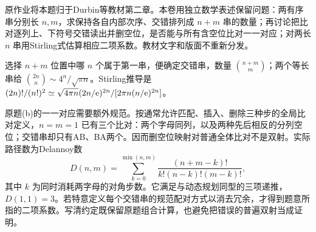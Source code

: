\begin{exercise}
原作业将本题归于Durbin等教材第二章。本卷用独立数学表述保留问题：两有序串分别长 $n,m$，求保持各自内部次序、交错排列成 $n+m$ 串的数量；再讨论把比对逐列上、下符号交错读出并删空位，是否能与所有含空位比对一一对应；对两长 $n$ 串用Stirling式估算相应二项系数。教材文字和版面不重新分发。
\end{exercise}
\begin{solution}
选择 $n+m$ 位置中哪 $n$ 个属于第一串，便确定交错串，数量 $\binom{n+m}m$；两个等长串给 $\binom{2n}n\sim4^n/\sqrt{\pi n}$。Stirling推导是 $(2n)!/(n!)^2\simeq\sqrt{4\pi n}(2n/\mathrm e)^{2n}/[2\pi n(n/\mathrm e)^{2n}]$。

原题(b)的一一对应需要额外规范。按通常允许匹配、插入、删除三种步的全局比对定义，$n=m=1$ 已有三个比对：两个字母同列，以及两种先后相反的分列空位；交错串却只有AB、BA两个。因而删空位映射对普通全体比对不是双射。实际路径数为Delannoy数
\[
D(n,m)=\sum_{k=0}^{\min(n,m)}\frac{(n+m-k)!}{k!(n-k)!(m-k)!},
\]
其中 $k$ 为同时消耗两字母的对角步数。它满足与动态规划同型的三项递推，$D(1,1)=3$。若特意定义每个交错串的规范配对方式以消去冗余，才得到题意所指的二项系数。写清约定既保留原题组合计算，也避免把错误的普遍双射当成证明。
\end{solution}

